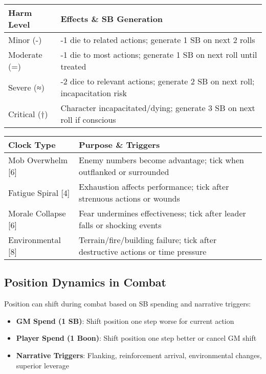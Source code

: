 \begin{fatebox}
\begin{tabularx}{\textwidth}{lX}
\toprule
\textbf{Harm Level} & \textbf{Effects \& SB Generation} \\
\midrule
Minor (-) & -1 die to related actions; generate 1 SB on next 2 rolls \\
Moderate (=) & -1 die to most actions; generate 1 SB on next roll until treated \\
Severe (≈) & -2 dice to relevant actions; generate 2 SB on next roll; incapacitation risk \\
Critical (†) & Character incapacitated/dying; generate 3 SB on next roll if conscious \\
\bottomrule
\end{tabularx}
\end{fatebox}

\begin{fatebox}
\begin{tabularx}{\textwidth}{lX}
\toprule
\textbf{Clock Type} & \textbf{Purpose \& Triggers} \\
\midrule
Mob Overwhelm [6] & Enemy numbers become advantage; tick when outflanked or surrounded \\
Fatigue Spiral [4] & Exhaustion affects performance; tick after strenuous actions or wounds \\
Morale Collapse [6] & Fear undermines effectiveness; tick after leader falls or shocking events \\
Environmental [8] & Terrain/fire/building failure; tick after destructive actions or time pressure \\
\bottomrule
\end{tabularx}
\end{fatebox}

\subsection{Position Dynamics in Combat}

Position can shift during combat based on SB spending and narrative triggers:

\begin{itemize}
    \item \textbf{GM Spend (1 SB)}: Shift position one step worse for current action
    \item \textbf{Player Spend (1 Boon)}: Shift position one step better or cancel GM shift
    \item \textbf{Narrative Triggers}: Flanking, reinforcement arrival, environmental changes, superior leverage
\end{itemize}

